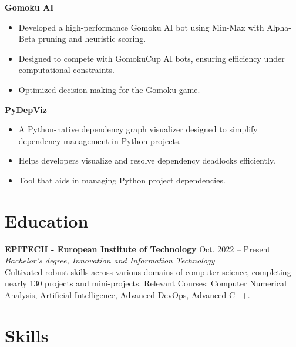\documentclass[letterpaper,11pt]{article}
\begin{document}
\textbf{Gomoku AI} \\
\begin{itemize}
    
    \item Developed a high-performance Gomoku AI bot using Min-Max with Alpha-Beta pruning and heuristic scoring.
    
    \item Designed to compete with GomokuCup AI bots, ensuring efficiency under computational constraints.
    
    
    \item Optimized decision-making for the Gomoku game.
    
\end{itemize}

\textbf{PyDepViz} \\
\begin{itemize}
    
    \item A Python-native dependency graph visualizer designed to simplify dependency management in Python projects.
    
    \item Helps developers visualize and resolve dependency deadlocks efficiently.
    
    
    \item Tool that aids in managing Python project dependencies.
    
\end{itemize}




\section*{Education}

\textbf{EPITECH - European Institute of Technology} \hfill Oct. 2022 -- Present \\
\textit{Bachelor's degree, Innovation and Information Technology} \\

Cultivated robust skills across various domains of computer science, completing nearly 130 projects and mini-projects. Relevant Courses: Computer Numerical Analysis, Artificial Intelligence, Advanced DevOps, Advanced C++.





\section*{Skills}
\end{document}

